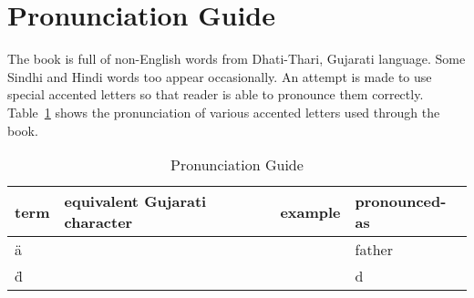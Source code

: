 \chapter*{Pronunciation Guide}

The book is full of non-English words from Dhati-Thari, Gujarati language. Some Sindhi and Hindi words too appear occasionally. An attempt is made to use special accented letters so that reader is able to pronounce them correctly. Table~\ref{tbl:pronunciation} shows the pronunciation of various accented letters used through the book.

\begin{table}
\begin{center}
\begin{tabular}{|l|l|l|l|}
\hline
\textbf{term} & \textbf{equivalent Gujarati character}  & \textbf{example} & \textbf{pronounced-as} \\
\hline
\"{a} &  &  & father \\
\"{d} &  &  & d\M{e} \\
\hline

\hline
\end{tabular}
\end{center}
\caption{Pronunciation Guide}
\label{tbl:pronunciation}
\end{table}

